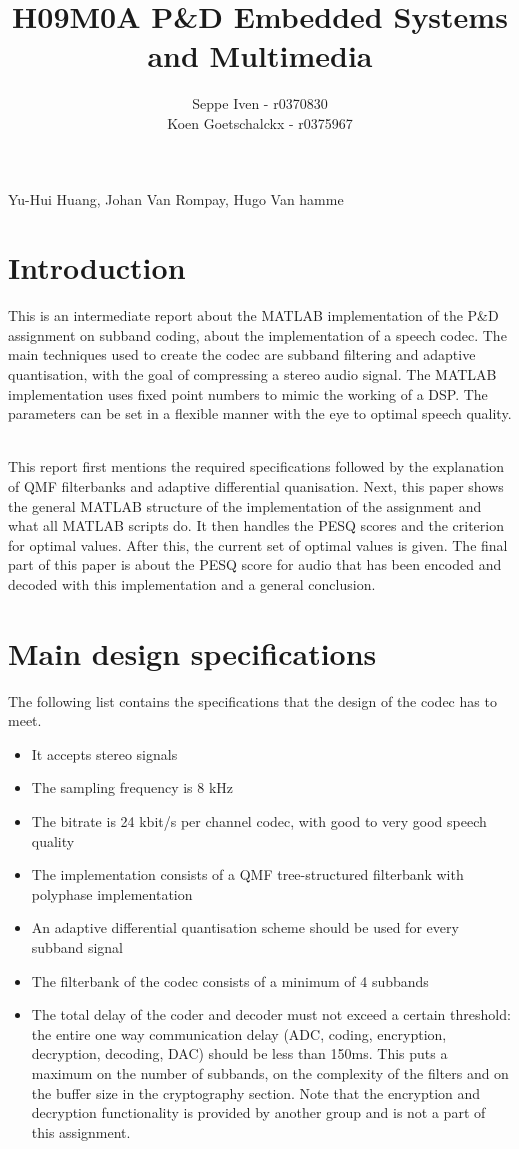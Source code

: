 \documentclass[a4paper]{article}
\title{H09M0A P\&D Embedded Systems and Multimedia}
\author{Seppe Iven - r0370830 \\ Koen Goetschalckx - r0375967}
\begin{document}
 
\maketitle
\begin{center} Yu-Hui Huang, Johan Van Rompay, Hugo Van hamme
\end{center}

\section{Introduction}
This is an intermediate report about the MATLAB implementation of the P\&D assignment on subband coding, about the implementation of a speech codec. The main techniques used to create the codec are subband filtering and adaptive quantisation, with the goal of compressing a stereo audio signal. The MATLAB implementation uses fixed point numbers to mimic the working of a DSP. The parameters can be set in a flexible manner with the eye to optimal speech quality. \

This report first mentions the required specifications followed by the explanation of QMF filterbanks and adaptive differential quanisation. Next, this paper shows the general MATLAB structure of the implementation of the assignment and what all MATLAB scripts do. It then handles the PESQ scores and the criterion for optimal values. After this, the current set of optimal values is given. The final part of this paper is about the PESQ score for audio that has been encoded and decoded with this implementation and a general conclusion.

\section{Main design specifications}
The following list contains the specifications that the design of the codec has to meet.

\begin{itemize}
\item It accepts stereo signals
\item The sampling frequency is 8 kHz
\item The bitrate is 24 kbit/s per channel codec, with good to very good speech quality
\item The implementation consists of a QMF tree-structured filterbank with polyphase implementation
\item An adaptive differential quantisation scheme should be used for every subband signal
\item The filterbank of the codec consists of a minimum of 4 subbands
\item The total delay of the coder and decoder must not exceed a certain threshold: the entire one way communication delay (ADC, coding, encryption, decryption, decoding, DAC) should be less than 150ms. This puts a maximum on the number of subbands, on the complexity of the filters and on the buffer size in the cryptography section. Note that the encryption and decryption functionality is provided by another group and is not a part of this assignment.

\end{itemize}
\end{document}
